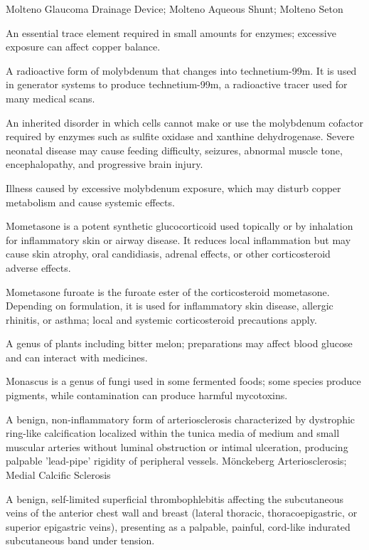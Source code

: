 \synonyms
Molteno Glaucoma Drainage Device; Molteno Aqueous Shunt; Molteno Seton

 An essential trace element required in small amounts for enzymes; excessive exposure can affect copper balance.

 A radioactive form of molybdenum that changes into technetium-99m. It is used in generator systems to produce technetium-99m, a radioactive tracer used for many medical scans.

 An inherited disorder in which cells cannot make or use the molybdenum cofactor required by enzymes such as sulfite oxidase and xanthine dehydrogenase. Severe neonatal disease may cause feeding difficulty, seizures, abnormal muscle tone, encephalopathy, and progressive brain injury.

 Illness caused by excessive molybdenum exposure, which may disturb copper metabolism and cause systemic effects.

 Mometasone is a potent synthetic glucocorticoid used topically or by inhalation for inflammatory skin or airway disease. It reduces local inflammation but may cause skin atrophy, oral candidiasis, adrenal effects, or other corticosteroid adverse effects.

 Mometasone furoate is the furoate ester of the corticosteroid mometasone. Depending on formulation, it is used for inflammatory skin disease, allergic rhinitis, or asthma; local and systemic corticosteroid precautions apply.

 A genus of plants including bitter melon; preparations may affect blood glucose and can interact with medicines.

 Monascus is a genus of fungi used in some fermented foods; some species produce pigments, while contamination can produce harmful mycotoxins.

 A benign, non-inflammatory form of arteriosclerosis characterized by dystrophic ring-like calcification localized within the tunica media of medium and small muscular arteries without luminal obstruction or intimal ulceration, producing palpable 'lead-pipe' rigidity of peripheral vessels.
\synonyms
Mönckeberg Arteriosclerosis; Medial Calcific Sclerosis

 A benign, self-limited superficial thrombophlebitis affecting the subcutaneous veins of the anterior chest wall and breast (lateral thoracic, thoracoepigastric, or superior epigastric veins), presenting as a palpable, painful, cord-like indurated subcutaneous band under tension.

